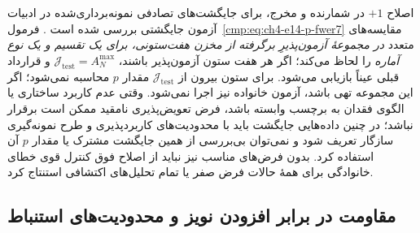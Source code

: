اصلاح $+1$ در شمارنده
و مخرج،
برای جایگشت‌های
تصادفی نمونه‌برداری‌شده
در ادبیات آزمون جایگشتی
بررسی شده است
\cite{PhipsonSmyth2010Permutation}.
فرمول~\eqref{cmp:eq:ch4-e14-p-fwer7}
مقایسه‌های متعدد
\emph{در مجموعهٔ آزمون‌پذیرِ
برگرفته از مخزن هفت‌ستونی،
برای یک تقسیم و
یک نوع آماره}
را لحاظ می‌کند؛
اگر هر هفت ستون آزمون‌پذیر باشند،
$\mathcal J_{\mathrm{test}}=A_N^{\max}$
و قرارداد قبلی عیناً بازیابی می‌شود.
برای ستون بیرون از $\mathcal J_{\mathrm{test}}$
مقدار $p$ محاسبه نمی‌شود؛
اگر این مجموعه تهی باشد،
آزمون خانواده نیز اجرا نمی‌شود.
وقتی عدم کاربرد ساختاری یا
الگوی فقدان به برچسب وابسته باشد،
فرض تعویض‌پذیری نامقید ممکن است
برقرار نباشد؛ در چنین داده‌هایی
جایگشت باید با محدودیت‌های کاربردپذیری
و طرح نمونه‌گیری سازگار تعریف شود
و نمی‌توان بی‌بررسی از همین
جایگشت مشترک یا مقدار $p$ آن
استفاده کرد.
بدون فرض‌های مناسب نیز نباید از
اصلاح فوق کنترل قوی خطای خانوادگی
برای همهٔ حالات فرض صفر یا
تمام تحلیل‌های اکتشافی استنتاج کرد.



\subsection{مقاومت در برابر افزودن نویز و محدودیت‌های استنباط}

